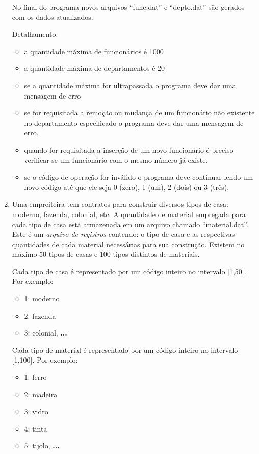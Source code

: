 \begin{enumerate}
No final do programa novos arquivos ``func.dat'' e ``depto.dat'' são
gerados com os dados atualizados.

Detalhamento:
\begin{itemize}
\item a quantidade máxima de funcionários é 1000
\item a quantidade máxima de departamentos é 20
\item se a quantidade máxima for ultrapassada o programa deve dar uma
mensagem de erro
\item se for requisitada a remoção ou mudança de um funcionário não
  existente no departamento especificado o programa deve dar uma mensagem
  de erro.
\item quando for requisitada a inserção de um novo funcionário é preciso
  verificar se um funcionário com o mesmo número já existe.
\item se o código de operação for inválido o programa deve continuar lendo
um novo código até que ele seja 0 (zero), 1 (um), 2 (dois) ou 3 (três).
\end{itemize}


\item Uma empreiteira tem contratos para construir diversos tipos de casa: moderno,
fazenda, colonial, etc.   A quantidade de material empregada para cada
tipo de casa está armazenada em um arquivo chamado  ``material.dat''.
Este é um {\em arquivo de registros} contendo: o tipo de casa e as respectivas
quantidades de cada material necessárias para sua
construção. Existem no máximo 50 tipos de casas e 100 tipos distintos de
materiais. 

Cada tipo de casa é representado por um código inteiro no intervalo [1,50].
Por exemplo:  
\begin{itemize}
\item 1: moderno
\item 2: fazenda
\item 3: colonial, {\bf ...}
\end{itemize}

Cada tipo de material é representado por um código inteiro no intervalo
[1,100].  Por exemplo: 
\begin{itemize}
\item 1: ferro
\item 2: madeira
\item 3: vidro
\item 4: tinta
\item 5: tijolo, {\bf ...}
\end{itemize}


\end{enumerate}
